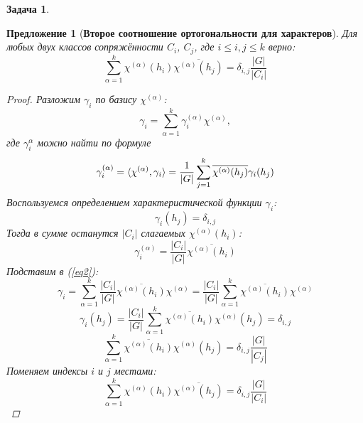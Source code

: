 \documentclass[12pt]{article}
\newtheorem{predl}[theorem]{Предложение}
\theoremstyle{definition}
\newtheorem{zad}{Задача}[section]
\begin{document}
\begin{zad}
\begin{predl}[\textbf{Второе соотношение ортогональности для характеров}]
    Для любых двух классов сопряжённости $C_i$, $C_j$, где $i\leq i,j\leq k$ верно:
    \begin{equation}
        \sum\limits_{\alpha=1}^k\chi^{(\alpha)}(h_i)\overline{\chi^{(\alpha)}(h_j)}=\delta_{i,j}\frac{|G|}{|C_i|}
    \end{equation}
    \begin{proof}
        Разложим $\gamma_i$ по базису $\chi^{(\alpha)}$:
        \begin{equation}\label{eq2}
            \gamma_i=\sum\limits_{\alpha=1}^k\gamma_i^{(\alpha)}\chi^{(\alpha)},
        \end{equation} 
        где $\gamma_i^\alpha$ можно найти по формуле
        \begin{equation}
            \gamma_i^{(\alpha)}=\braket{\chi^{(\alpha)},\gamma_i}=\frac{1}{|G|}\sum\limits_{j=1}^k\overline{\chi^{(\alpha)}(h_j)}\gamma_i(h_j)
        \end{equation}
        Воспользуемся определением характеристической функции $\gamma_i$:
        \begin{equation}
            \gamma_i(h_j)=\delta_{i,j}
        \end{equation}
        Тогда в сумме останутся $|C_i|$ слагаемых $\chi^{(\alpha)}(h_i)$:
        \begin{equation}
            \gamma_i^{(\alpha)}=\frac{|C_i|}{|G|}\overline{\chi^{(\alpha)}(h_i)}
        \end{equation}
        Подставим в (\ref{eq2}):
        \begin{equation}
            \gamma_i=\sum\limits_{\alpha=1}^k\frac{|C_i|}{|G|}\overline{\chi^{(\alpha)}(h_i)}\chi^{(\alpha)}=\frac{|C_i|}{|G|}\sum\limits_{\alpha=1}^k\overline{\chi^{(\alpha)}(h_i)}\chi^{(\alpha)}
        \end{equation}
        \begin{equation}
            \gamma_i(h_j)=\frac{|C_i|}{|G|}\sum\limits_{\alpha=1}^k\overline{\chi^{(\alpha)}(h_i)}\chi^{(\alpha)}(h_j)=\delta_{i,j}
        \end{equation}
        \begin{equation}
            \sum\limits_{\alpha=1}^k\overline{\chi^{(\alpha)}(h_i)}\chi^{(\alpha)}(h_j)=\delta_{i,j}\frac{|G|}{|C_j|}
        \end{equation}
        Поменяем индексы $i$ и $j$ местами:
        \begin{equation}
            \sum\limits_{\alpha=1}^k\chi^{(\alpha)}(h_i)\overline{\chi^{(\alpha)}(h_j)}=\delta_{i,j}\frac{|G|}{|C_i|}
        \end{equation}
    \end{proof}
\end{predl}
\end{zad}
\end{document}
